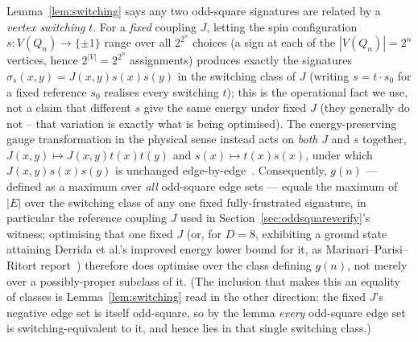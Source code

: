 \documentclass[12pt,a4paper]{article}
\theoremstyle{definition}
\begin{document}
Lemma~\ref{lem:switching} says any two odd-square signatures are related by
a \emph{vertex switching} $t$. For a \emph{fixed} coupling $J$, letting the
spin configuration $s:V(Q_n)\to\{\pm1\}$ range over all $2^{2^n}$ choices
(a sign at each of the $|V(Q_n)|=2^n$ vertices, hence $2^{|V|}=2^{2^n}$ assignments) produces
exactly the
signatures $\sigma_s(x,y)=J(x,y)s(x)s(y)$ in the switching class of $J$
(writing $s=t\cdot s_0$ for a fixed reference $s_0$ realises every
switching $t$); this is the operational fact we use, not a claim that
different $s$ give the same energy under fixed $J$ (they generally do
not -- that variation is exactly what is being optimised). The
energy-preserving gauge transformation in the physical sense instead
acts on \emph{both} $J$ and $s$ together, $J(x,y)\mapsto J(x,y)t(x)t(y)$
and $s(x)\mapsto t(x)s(x)$, under which $J(x,y)s(x)s(y)$ is unchanged
edge-by-edge~\cite{MPR95}.
Consequently, $g(n)$ — defined as a maximum over \emph{all} odd-square
edge sets — equals the maximum of $|E|$ over the switching class of any
one fixed fully-frustrated signature, in particular the reference coupling
$J$ used in Section~\ref{sec:oddsquareverify}'s witness; optimising that
one fixed $J$ (or, for $D=8$, exhibiting a ground state attaining
Derrida et al.'s improved energy lower bound for it, as
Marinari--Parisi--Ritort report~\cite{MPR95}) therefore does optimise
over the class defining $g(n)$, not merely over a possibly-proper
subclass of it. (The inclusion that makes this an equality of classes is
Lemma~\ref{lem:switching} read in the other direction: the fixed $J$'s
negative edge set is itself odd-square, so by the lemma \emph{every}
odd-square edge set is switching-equivalent to it, and hence lies in
that single switching class.)
\end{document}

